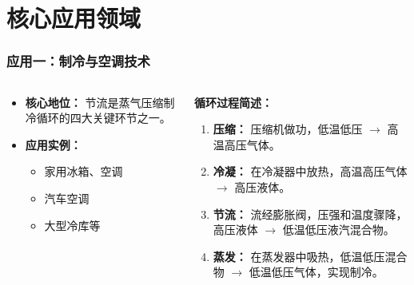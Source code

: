 \documentclass{beamer}
\begin{document}
\section{核心应用领域}

\begin{frame}
  \frametitle{应用一：制冷与空调技术}
  \begin{columns}[T]
    \begin{column}{0.5\textwidth}
      \begin{itemize}
        \item \textbf{核心地位：} 节流是蒸气压缩制冷循环的\alert{四大关键环节}之一。
        \vfill
        \item \textbf{应用实例：}
        \begin{itemize}
            \item 家用冰箱、空调
            \item 汽车空调
            \item 大型冷库等
        \end{itemize}
      \end{itemize}
    \end{column}
    \begin{column}{0.5\textwidth}
      \textbf{循环过程简述：}
      \begin{enumerate}
        \item<1-> \textbf{压缩：} 压缩机做功，低温低压 $\rightarrow$ 高温高压气体。
        \item<2-> \textbf{冷凝：} 在冷凝器中放热，高温高压气体 $\rightarrow$ 高压液体。
        \item<3-> \textbf{\alert{节流}：} 流经\alert{膨胀阀}，压强和温度骤降，高压液体 $\rightarrow$ 低温低压液汽混合物。
        \item<4-> \textbf{蒸发：} 在蒸发器中吸热，低温低压混合物 $\rightarrow$ 低温低压气体，实现制冷。
      \end{enumerate}
    \end{column}
  \end{columns}
\end{frame}
\end{document}
